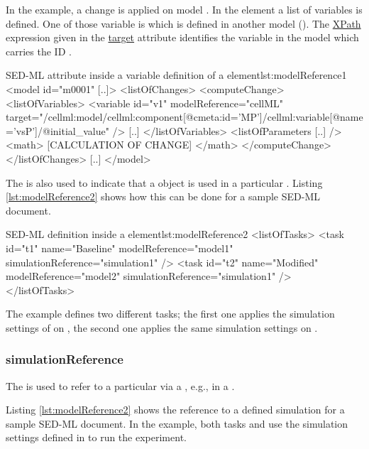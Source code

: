 In the example, a change is  applied on model . In the  element a list of variables is defined. One of those variable is  which is defined in another model (). The \hyperref[sec:xpath]{XPath} expression given in the \hyperref[sec:target]{target} attribute identifies the variable in the model which carries the ID .
\begin{myXmlLst}{SED-ML  attribute inside a variable definition of a  element}{lst:modelReference1}
<model id="m0001" [..]>
	<listOfChanges>
		<computeChange>
			<listOfVariables>
				<variable id="v1" modelReference="cellML" target="/cellml:model/cellml:component[@cmeta:id='MP']/cellml:variable[@name='vsP']/@initial_value" />
     			[..]
			</listOfVariables>
			<listOfParameters [..] />
    			<math>
     			[CALCULATION OF CHANGE]
    			</math>
   		</computeChange>
	</listOfChanges>
	[..]
</model>
\end{myXmlLst}

The  is also used to indicate that a \Model object is used in a particular  \Task. Listing \ref{lst:modelReference2} shows how this can be done for a sample SED-ML document.

\begin{myXmlLst}{SED-ML  definition inside a  element}{lst:modelReference2}
<listOfTasks>
	<task id="t1" name="Baseline" modelReference="model1" simulationReference="simulation1" />
	<task id="t2" name="Modified" modelReference="model2" simulationReference="simulation1" />
</listOfTasks>
\end{myXmlLst}

The example defines two different tasks; the first one applies the simulation settings of  on , the second one applies the same simulation settings on .


\subsubsection{simulationReference}
\label{sec:simulationReference}
The  is used to refer to a particular \Simulation  via a \SIdRef, e.g., in a \Task. 

Listing \ref{lst:modelReference2} shows the reference to a defined simulation for a sample SED-ML document. In the example, both tasks  and  use the simulation settings defined in  to run the experiment.


